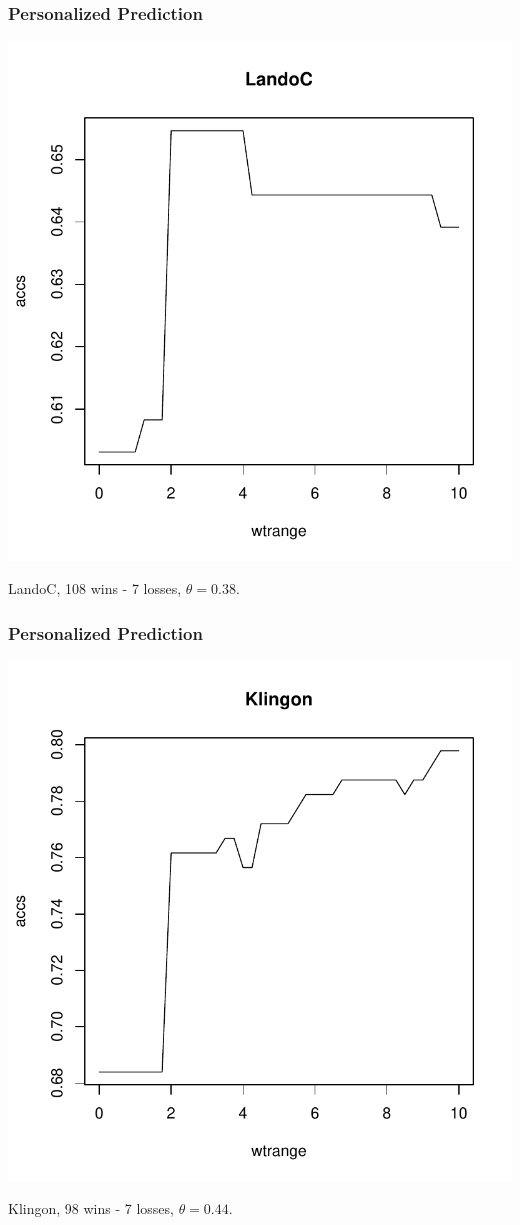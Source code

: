 \documentclass{beamer}
\begin{document}
\begin{frame}
\frametitle{Personalized Prediction}
\begin{center}
\includegraphics[scale = 0.4]{../prediction/presonalized_landoC.pdf}
\end{center}
LandoC, 108 wins - 7 losses, $\theta = 0.38$.
\end{frame}

\begin{frame}
\frametitle{Personalized Prediction}
\begin{center}
\includegraphics[scale = 0.4]{../prediction/personalized_klingon.pdf}
\end{center}
Klingon, 98 wins - 7 losses, $\theta = 0.44$.
\end{frame}
\end{document}
